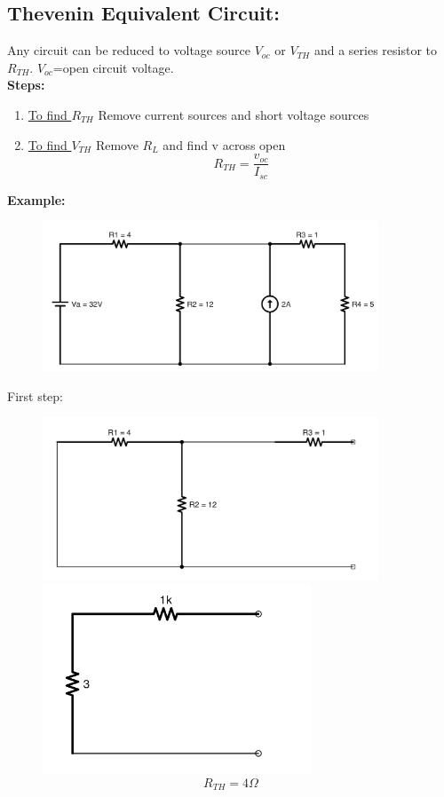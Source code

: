 \documentclass[a4paper,12]{article}
\begin{document}
\subsection{Thevenin Equivalent Circuit:}
Any circuit can be reduced to voltage source $V_{oc}$ or $V_{TH}$ and a series resistor to $R_{TH}$. $V_{oc}$=open circuit voltage.\\
\textbf{Steps:}
\begin{enumerate}
    \item\underline{ To find $R_{TH}$} Remove current sources and short voltage sources
    \item \underline{To find $V_{TH}$} Remove $R_L$ and find v across open
    \[R_{TH}=\frac{v_{oc}}{I_{sc}}\]
\end{enumerate}
\textbf{Example:}
\begin{figure}[H]
    \centering
    \includegraphics[width=100mm]{Image/12.jpg}
    \end{figure}
    First step:
    \begin{figure}[H]
    \centering
    \includegraphics[width=100mm]{Image/14.jpg}
    \includegraphics[width=80mm]{Image/15.jpg}
    \[R_{TH}=4\Omega\]
\end{figure}
\end{document}
